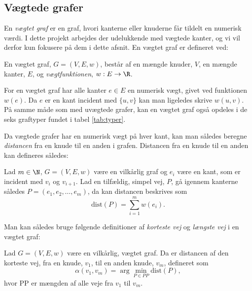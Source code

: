 \subsection{Vægtede grafer}
En \emph{vægtet graf} er en graf, hvori kanterne eller knuderne får tildelt en numerisk værdi. I dette projekt arbejdes der udelukkende med vægtede kanter, og vi vil derfor kun fokusere på dem i dette afsnit.
En vægtet graf er defineret ved:
\begin{defn}
En vægtet graf, $G=(V,E,w)$, består af en mængde knuder, $V$, en mængde kanter, $E$, og \emph{vægtfunktionen}, $w: E \rightarrow \R$.
\end{defn}

For en vægtet graf har alle kanter $e\in E$ en numerisk vægt, givet ved funktionen $w (e)$. Da $e$ er en kant incident med $\{u,v\}$ kan man ligeledes skrive $w (u,v)$. På samme måde som med uvægtede grafer, kan en vægtet graf også opdeles i de seks graftyper fundet i tabel \ref{tab:typer}.


Da vægtede grafer har en numerisk vægt på hver kant, kan man således beregne \emph{distancen} fra en knude til en anden i grafen. Distancen fra en knude til en anden kan defineres således:

\begin{defn}[Distance]
Lad $m\in \N $, $G=(V,E,w)$ være en vilkårlig graf og  $e_{i}$ være en kant, som er incident med $v_i$ og $v_{i+1}$. Lad en tilfældig, simpel vej, $P$, gå igennem kanterne således $P=(e_{1},e_{2},\dotsc,e_{m})$, da kan distancen beskrives som
	\begin{equation*}
	\mathrm{dist}(P)=\sum_{i=1}^{m}w(e_{i}).
	\end{equation*}  
\end{defn}

Man kan således bruge følgende definitioner af \emph{korteste vej} og \emph{længste vej} i en vægtet graf:


\begin{defn} \label{defn:min.vej}
Lad $G=(V,E,w)$ være en vilkårlig, vægtet graf. Da er distancen af den korteste vej, fra en knude, $v_1$, til en anden knude, $v_m$, defineret som
	\begin{equation*}
		\alpha(v_1,v_m)=\arg \min_{P \in PP}
		\textrm{dist}(P),
	\end{equation*}
	hvor PP er mængden af alle veje fra $v_1$ til $v_m$.
\end{defn}


